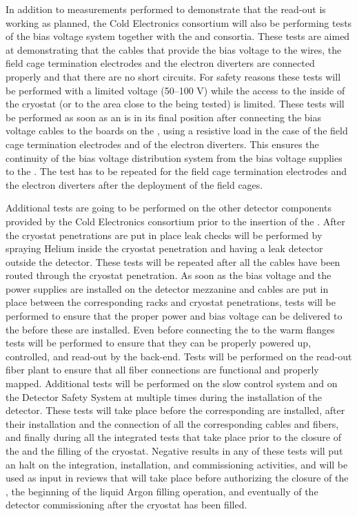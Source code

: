 In addition to measurements performed to demonstrate that the 
read-out is working as planned, the Cold Electronics consortium will also
be performing tests of the bias voltage system together with the 
and  consortia. These tests are aimed at demonstrating that
the cables that provide the bias voltage to the  wires, the
field cage termination electrodes and the electron diverters are connected
properly and that there are no short circuits. For safety reasons these
tests will be performed with a limited voltage (50--100 V) while the access
to the inside of the cryostat (or to the area close to the  being
tested) is limited. These tests will be performed as soon as an 
is in its final position after connecting the bias voltage cables to the 
 boards on the , using a resistive load in the case of the 
field cage termination electrodes and of the electron diverters. This ensures
the continuity of the bias voltage distribution system from the bias voltage
supplies to the . The test has to be repeated for the field cage
termination electrodes and the electron diverters after the deployment of
the field cages.

Additional tests are going to be performed on the other detector components
provided by the Cold Electronics consortium prior to the insertion of the
. After the cryostat penetrations are put in place leak checks
will be performed by spraying Helium inside the cryostat penetration and
having a leak detector outside the detector. These tests will be repeated 
after all the cables have been routed through the cryostat penetration.
As soon as the bias voltage and the power supplies are installed on the detector
mezzanine and cables are put in place between the corresponding racks and
cryostat penetrations, tests will be performed to ensure that the proper 
power and bias voltage can be delivered to the  before these
are installed. Even before connecting the  to the warm flanges
tests will be performed to ensure that they can be properly powered up, controlled,
and read-out by the  back-end. Tests will be performed on the
read-out fiber plant to ensure that all fiber connections are functional
and properly mapped. Additional tests will be performed on the slow control
system and on the Detector Safety System at multiple times during the
installation of the detector. These tests will take place before the
corresponding  are installed, after their installation and
the connection of all the corresponding cables and fibers, and finally
during all the integrated tests that take place prior to the closure of
the  and the filling of the cryostat. Negative results in any
of these tests will put an halt on the integration, installation, and
commissioning activities, and will be used as input in reviews that will
take place before authorizing the closure of the , the beginning
of the liquid Argon filling operation, and eventually of the detector 
commissioning after the cryostat has been filled.

